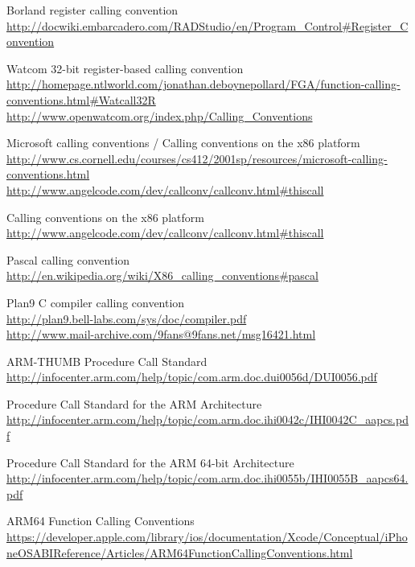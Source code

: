 \begin{thebibliography}{14}
	Borland register calling convention\\
	\url{http://docwiki.embarcadero.com/RADStudio/en/Program\_Control#Register\_Convention}

	Watcom 32-bit register-based calling convention\\
	\url{http://homepage.ntlworld.com/jonathan.deboynepollard/FGA/function-calling-conventions.html#Watcall32R}
	\url{http://www.openwatcom.org/index.php/Calling\_Conventions}

	Microsoft calling conventions / Calling conventions on the x86 platform\\
	\url{http://www.cs.cornell.edu/courses/cs412/2001sp/resources/microsoft-calling-conventions.html}\\
	\url{http://www.angelcode.com/dev/callconv/callconv.html#thiscall}

	Calling conventions on the x86 platform\\
	\url{http://www.angelcode.com/dev/callconv/callconv.html#thiscall}

	Pascal calling convention\\
	\url{http://en.wikipedia.org/wiki/X86\_calling\_conventions#pascal}%

	Plan9 C compiler calling convention\\
	\url{http://plan9.bell-labs.com/sys/doc/compiler.pdf}\\
	\url{http://www.mail-archive.com/9fans@9fans.net/msg16421.html}

	ARM-THUMB Procedure Call Standard\\
	\url{http://infocenter.arm.com/help/topic/com.arm.doc.dui0056d/DUI0056.pdf}

	Procedure Call Standard for the ARM Architecture\\
	\url{http://infocenter.arm.com/help/topic/com.arm.doc.ihi0042c/IHI0042C\_aapcs.pdf}

	Procedure Call Standard for the ARM 64-bit Architecture\\
	\url{http://infocenter.arm.com/help/topic/com.arm.doc.ihi0055b/IHI0055B\_aapcs64.pdf}

	ARM64 Function Calling Conventions\\
	\url{https://developer.apple.com/library/ios/documentation/Xcode/Conceptual/iPhoneOSABIReference/Articles/ARM64FunctionCallingConventions.html}


\end{thebibliography}
